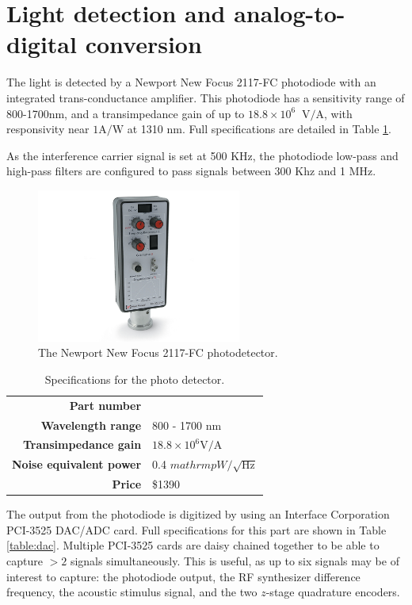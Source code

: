 \section{Light detection and analog-to-digital conversion}

The light is detected by a Newport New Focus 2117-FC photodiode with an integrated trans-conductance amplifier. This photodiode has a sensitivity range of 800-1700nm, and a transimpedance gain of up to $18.8 \times 10^6 \;\; \mathrm{V}/\mathrm{A}$, with responsivity near $1 \mathrm{A}/\mathrm{W}$ at 1310 nm. Full specifications are detailed in Table \ref{table:pd}.

As the interference carrier signal is set at 500 KHz, the photodiode low-pass and high-pass filters are configured to pass signals between 300 Khz and 1 MHz.

\begin{figure}[h!]

\centering
\includegraphics[width=0.6\textwidth]{Images/System/pd.jpg}
\caption{The Newport New Focus 2117-FC photodetector.}
\end{figure}

\begin{table}[h!]
\centering
\begin{tabular}{ >{\bf}r | l}
Part number & \\
Wavelength range & 800 - 1700 nm \\
Transimpedance gain & $18.8 \times 10^6 \mathrm{V/A}$ \\
Noise equivalent power & 0.4 $mathrm{pW}/\sqrt{\mathrm{Hz}}$ \\
Price & \$1390 \\
\end{tabular}
\caption{Specifications for the photo detector. \label{table:pd}}
\end{table}

The output from the photodiode is digitized by using an Interface Corporation PCI-3525 DAC/ADC card. Full specifications for this part are shown in Table \ref{table:dac}. Multiple PCI-3525 cards are daisy chained together to be able to capture $>2$ signals simultaneously. This is useful, as up to six signals may be of interest to capture: the photodiode output, the RF synthesizer difference frequency, the acoustic stimulus signal, and the two $z$-stage quadrature encoders.

